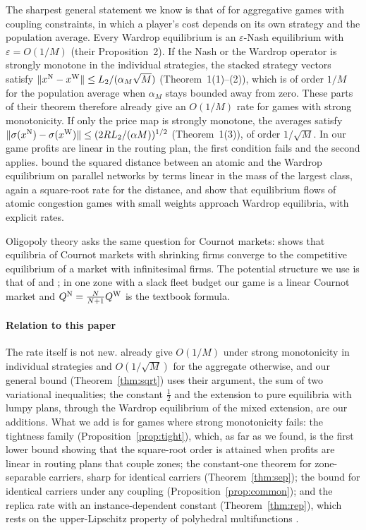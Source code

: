 \documentclass[preprint,11pt,authoryear]{elsarticle}
\theoremstyle{plain}
\theoremstyle{remark}
\begin{document}
The sharpest general statement we know is that of \citet{Paccagnan2019} for aggregative games with coupling constraints, in which a player's cost depends on its own strategy and the population average. Every Wardrop equilibrium is an $\varepsilon$-Nash equilibrium with $\varepsilon=O(1/M)$ (their Proposition~2). If the Nash or the Wardrop operator is strongly monotone in the individual strategies, the stacked strategy vectors satisfy $\|x^{\mathrm{N}}-x^{\mathrm{W}}\|\le L_2/(\alpha_M\sqrt M)$ (Theorem~1(1)--(2)), which is of order $1/M$ for the population average when $\alpha_M$ stays bounded away from zero. These parts of their theorem therefore already give an $O(1/M)$ rate for games with strong monotonicity. If only the price map is strongly monotone, the averages satisfy $\|\sigma(x^{\mathrm{N}})-\sigma(x^{\mathrm{W}})\|\le(2RL_2/(\alpha M))^{1/2}$ (Theorem~1(3)), of order $1/\sqrt M$. In our game profits are linear in the routing plan, the first condition fails and the second applies. \citet{JacquotWan2018} bound the squared distance between an atomic and the Wardrop equilibrium on parallel networks by terms linear in the mass of the largest class, again a square-root rate for the distance, and \citet{Cominetti2023} show that equilibrium flows of atomic congestion games with small weights approach Wardrop equilibria, with explicit rates.

Oligopoly theory asks the same question for Cournot markets: \citet{Novshek1985} shows that equilibria of Cournot markets with shrinking firms converge to the competitive equilibrium of a market with infinitesimal firms. The potential structure we use is that of \citet{Slade1994} and \citet{Monderer1996}; in one zone with a slack fleet budget our game is a linear Cournot market and $Q^{\mathrm{N}}=\frac N{N+1}Q^{\mathrm{W}}$ is the textbook formula.

\paragraph{Relation to this paper} The rate itself is not new. \citeauthor{Paccagnan2019} already give $O(1/M)$ under strong monotonicity in individual strategies and $O(1/\sqrt M)$ for the aggregate otherwise, and our general bound (Theorem~\ref{thm:sqrt}) uses their argument, the sum of two variational inequalities; the constant $\tfrac12$ and the extension to pure equilibria with lumpy plans, through the Wardrop equilibrium of the mixed extension, are our additions. What we add is for games where strong monotonicity fails: the tightness family (Proposition~\ref{prop:tight}), which, as far as we found, is the first lower bound showing that the square-root order is attained when profits are linear in routing plans that couple zones; the constant-one theorem for zone-separable carriers, sharp for identical carriers (Theorem~\ref{thm:sep}); the bound for identical carriers under any coupling (Proposition~\ref{prop:common}); and the replica rate with an instance-dependent constant (Theorem~\ref{thm:rep}), which rests on the upper-Lipschitz property of polyhedral multifunctions \citep{Robinson1981}.
\end{document}
